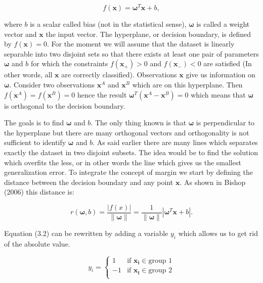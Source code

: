 \documentclass[a4paper,12pt]{article}
\numberwithin{equation}{section}
\begin{document}
\begin{equation}\label{eq:1}
f(\boldsymbol{x}) = \boldsymbol{\omega}^T\boldsymbol{x} + b,
\end{equation}

\noindent

where $b$ is a scalar called bias (not in the statistical sense), $\boldsymbol{\omega}$ is called a weight vector and $\boldsymbol{x}$ the input vector. The hyperplane, or decision boundary, is defined by $ f(\boldsymbol{x}) = 0 $. For the moment we will assume that the dataset is linearly separable into two disjoint sets so that there exists at least one pair of parameters $\boldsymbol{\omega}$ and $b$ for which the constraints $f(\boldsymbol{x_+}) > 0 $ and $f(\boldsymbol{x_-}) < 0 $ are satisfied (In other words, all $\boldsymbol{x}$ are correctly classified). Observations $\boldsymbol{x}$ give us information on $\boldsymbol{\omega}$. Consider two observations $\boldsymbol{x}^A$ and $\boldsymbol{x}^B$ which are on this hyperplane. Then $ f(\boldsymbol{x}^A) = f(\boldsymbol{x}^B) = 0 $ hence the result $ \boldsymbol{\omega}^T(\boldsymbol{x}^A-\boldsymbol{x}^B) = 0 $ which means that $\boldsymbol{\omega}$ is orthogonal to the decision boundary.\par
The goals is to find $\boldsymbol{\omega}$ and $b$. The only thing known is that $\boldsymbol{\omega}$ is perpendicular to the hyperplane but there are many orthogonal vectors and orthogonality is not sufficient to identify $\boldsymbol{\omega}$ and $b$. As said earlier there are many lines which separates exactly the dataset in two disjoint subsets. The idea would be to find the solution which overfits the less, or in other words the line which gives us the smallest generalization error. To integrate the concept of margin we start by defining the distance between the decision boundary and any point $\boldsymbol{x}$. As shown in Bishop (2006) this distance is:

\begin{equation}\label{eq:2}
r(\boldsymbol{\omega}, b) = \frac{|f(x)|}{\|\boldsymbol{\omega}\|} = \frac{1}{\|\boldsymbol{\omega}\|}|\boldsymbol{\omega}^T\boldsymbol{x}+b|.
\end{equation}

Equation (3.2) can be rewritten by adding a variable $y_i$ which allows us to get rid of the absolute value.

\begin{equation}\label{eq:3}
    y_i = \begin{cases}
               1               & \mbox{if }\boldsymbol{x_i} \in \mbox{group 1}\\
               -1               & \mbox{if }\boldsymbol{x_i} \in \mbox{group 2} \\
           \end{cases}
\end{equation}
\end{document}
